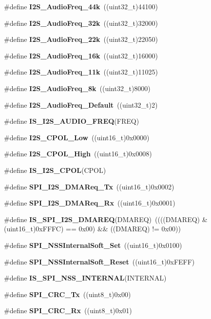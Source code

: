 \begin{DoxyCompactItemize}
\item 
\#define \textbf{ I2\+S\+\_\+\+Audio\+Freq\+\_\+44k}~((uint32\+\_\+t)44100)
\item 
\#define \textbf{ I2\+S\+\_\+\+Audio\+Freq\+\_\+32k}~((uint32\+\_\+t)32000)
\item 
\#define \textbf{ I2\+S\+\_\+\+Audio\+Freq\+\_\+22k}~((uint32\+\_\+t)22050)
\item 
\#define \textbf{ I2\+S\+\_\+\+Audio\+Freq\+\_\+16k}~((uint32\+\_\+t)16000)
\item 
\#define \textbf{ I2\+S\+\_\+\+Audio\+Freq\+\_\+11k}~((uint32\+\_\+t)11025)
\item 
\#define \textbf{ I2\+S\+\_\+\+Audio\+Freq\+\_\+8k}~((uint32\+\_\+t)8000)
\item 
\#define \textbf{ I2\+S\+\_\+\+Audio\+Freq\+\_\+\+Default}~((uint32\+\_\+t)2)
\item 
\#define \textbf{ I\+S\+\_\+\+I2\+S\+\_\+\+A\+U\+D\+I\+O\+\_\+\+F\+R\+EQ}(F\+R\+EQ)
\item 
\#define \textbf{ I2\+S\+\_\+\+C\+P\+O\+L\+\_\+\+Low}~((uint16\+\_\+t)0x0000)
\item 
\#define \textbf{ I2\+S\+\_\+\+C\+P\+O\+L\+\_\+\+High}~((uint16\+\_\+t)0x0008)
\item 
\#define \textbf{ I\+S\+\_\+\+I2\+S\+\_\+\+C\+P\+OL}(C\+P\+OL)
\item 
\#define \textbf{ S\+P\+I\+\_\+\+I2\+S\+\_\+\+D\+M\+A\+Req\+\_\+\+Tx}~((uint16\+\_\+t)0x0002)
\item 
\#define \textbf{ S\+P\+I\+\_\+\+I2\+S\+\_\+\+D\+M\+A\+Req\+\_\+\+Rx}~((uint16\+\_\+t)0x0001)
\item 
\#define \textbf{ I\+S\+\_\+\+S\+P\+I\+\_\+\+I2\+S\+\_\+\+D\+M\+A\+R\+EQ}(D\+M\+A\+R\+EQ)~((((D\+M\+A\+R\+EQ) \& (uint16\+\_\+t)0x\+F\+F\+F\+C) == 0x00) \&\& ((\+D\+M\+A\+R\+E\+Q) != 0x00))
\item 
\#define \textbf{ S\+P\+I\+\_\+\+N\+S\+S\+Internal\+Soft\+\_\+\+Set}~((uint16\+\_\+t)0x0100)
\item 
\#define \textbf{ S\+P\+I\+\_\+\+N\+S\+S\+Internal\+Soft\+\_\+\+Reset}~((uint16\+\_\+t)0x\+F\+E\+F\+F)
\item 
\#define \textbf{ I\+S\+\_\+\+S\+P\+I\+\_\+\+N\+S\+S\+\_\+\+I\+N\+T\+E\+R\+N\+AL}(I\+N\+T\+E\+R\+N\+AL)
\item 
\#define \textbf{ S\+P\+I\+\_\+\+C\+R\+C\+\_\+\+Tx}~((uint8\+\_\+t)0x00)
\item 
\#define \textbf{ S\+P\+I\+\_\+\+C\+R\+C\+\_\+\+Rx}~((uint8\+\_\+t)0x01)
\item 

\end{DoxyCompactItemize}
